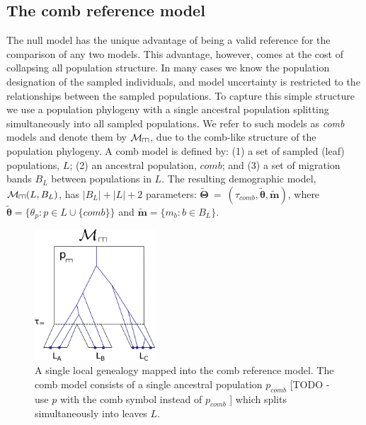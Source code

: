\documentclass[11pt]{article}
\newcommand{\vect}[1]{\boldsymbol{\mathbf{#1}}}
\newcommand{\M}{\mathcal{M}}
\newcommand{\T}{\vect{\Theta}}
\newcommand{\Tref}{\widetilde{\T}}
\newcommand{\1}{\mathbbm{1}}
\def\comb{\rotatebox[origin=c]{90}{$\exists$}}
\newcommand{\Mcomb}{\M_{\comb}}
\newcommand{\thetas}{\vect\theta}
\newcommand{\migs}{\vect{m}}
\newcommand{\tacomb}{\tau_{comb}}
\def\comb{\rotatebox[origin=c]{90}{$\exists$}}
\begin{document}
\subsection{The comb reference model}


The null model has the unique advantage of being a valid reference for the comparison of any two models.
This advantage, however, comes at the cost of collapsing all population structure.
%
In many cases we know the population designation of the sampled individuals, and model uncertainty is restricted to the relationships between the sampled populations.
%
To capture this simple structure we use a population phylogeny with a single ancestral population splitting simultaneously into all sampled populations.
We refer to such models as {\em comb} models and denote them by $\Mcomb$,  due to the comb-like structure of the population phylogeny.
%
A comb model is defined by: (1) a set of sampled (leaf) populations, $L$; (2) an ancestral population, $comb$; and (3) a set of migration bands $B_L$ between populations in $L$.
%
The resulting demographic model, $\Mcomb(L,B_L)$, has $|B_L|+|L|+2$ parameters: $\Tref ~=~ (\tacomb, \widetilde{\thetas},\widetilde{\migs})$,
where $\widetilde{\thetas}=\{\theta_p:p\in L\cup \{comb\}\}$ and $\widetilde{\migs} = \{m_b:b\in B_L\}$.
%

\begin{figure}[h]
\centering
\includegraphics[width=0.4\textwidth]
{comb_model_single_genealogy}
\captionsetup{width=.8\textwidth}
\caption{A single local genealogy mapped into the comb reference model. The comb model consists of a single ancestral population $p_{comb}$ [TODO - use $p$ with the comb symbol instead of $p_{comb}$ ] which splits simultaneously into leaves $L$.}
\label{fig:comb_model_single_genealogy}
\end{figure}
\end{document}
